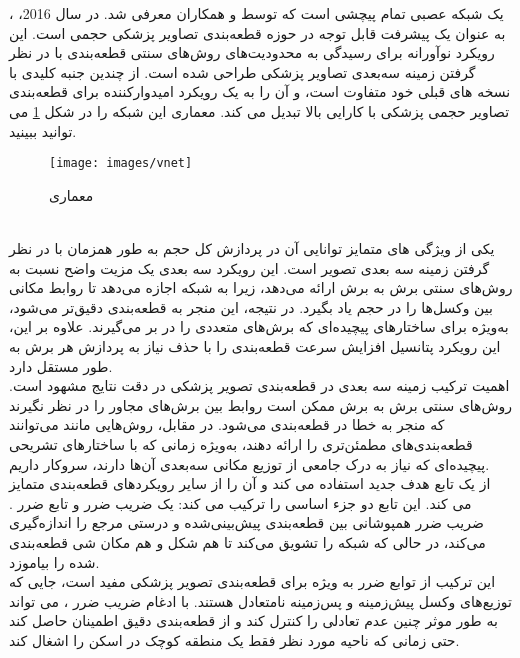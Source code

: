 ، یک شبکه عصبی تمام پیچشی است که توسط و همکاران\cite{shamshad2023transformers} معرفی شد. در سال 2016، به عنوان یک پیشرفت قابل توجه در حوزه قطعه‌بندی تصاویر پزشکی حجمی است. این رویکرد نوآورانه برای رسیدگی به محدودیت‌های روش‌های سنتی قطعه‌بندی با در نظر گرفتن زمینه سه‌بعدی تصاویر پزشکی طراحی شده است.  از چندین جنبه کلیدی با نسخه های قبلی خود متفاوت است، و آن را به یک رویکرد امیدوارکننده برای قطعه‌بندی تصاویر حجمی پزشکی با کارایی بالا تبدیل می کند. معماری این شبکه را در شکل \ref{fig:vnet} می توانید ببینید.
\\
\begin{figure}[ht]
\centerline{\texttt{[image: images/vnet]}}
\caption[\hspace{0.5em}معماری ]{معماری \cite{shamshad2023transformers}}
\label{fig:vnet}
\end{figure}
\\
یکی از ویژگی های متمایز  توانایی آن در پردازش کل حجم به طور همزمان با در نظر گرفتن زمینه سه بعدی تصویر است. این رویکرد سه بعدی یک مزیت واضح نسبت به روش‌های سنتی برش به برش ارائه می‌دهد، زیرا به شبکه اجازه می‌دهد تا روابط مکانی بین وکسل‌ها را در حجم یاد بگیرد. در نتیجه، این منجر به قطعه‌بندی دقیق‌تر می‌شود، به‌ویژه برای ساختارهای پیچیده‌ای که برش‌های متعددی را در بر می‌گیرند. علاوه بر این، این رویکرد پتانسیل افزایش سرعت قطعه‌بندی را با حذف نیاز به پردازش هر برش به طور مستقل دارد.
\\
اهمیت ترکیب زمینه سه بعدی در قطعه‌بندی تصویر پزشکی در دقت نتایج مشهود است. روش‌های سنتی برش به برش ممکن است روابط بین برش‌های مجاور را در نظر نگیرند که منجر به خطا در قطعه‌بندی می‌شود. در مقابل، روش‌هایی مانند  می‌توانند قطعه‌بندی‌های مطمئن‌تری را ارائه دهند، به‌ویژه زمانی که با ساختارهای تشریحی پیچیده‌ای که نیاز به درک جامعی از توزیع مکانی سه‌بعدی آن‌ها دارند، سروکار داریم.
\\
 از یک تابع هدف جدید استفاده می کند و آن را از سایر رویکردهای قطعه‌بندی متمایز می کند. این تابع دو جزء اساسی را ترکیب می کند: یک ضریب ضرر  و تابع ضرر . ضریب ضرر  همپوشانی بین قطعه‌بندی پیش‌بینی‌شده و درستی مرجع را اندازه‌گیری می‌کند، در حالی که  شبکه را تشویق می‌کند تا هم شکل و هم مکان شی قطعه‌بندی شده را بیاموزد.
\\
این ترکیب از توابع ضرر به ویژه برای قطعه‌بندی تصویر پزشکی مفید است، جایی که توزیع‌های وکسل پیش‌زمینه و پس‌زمینه نامتعادل هستند.  با ادغام ضریب ضرر ، می تواند به طور موثر چنین عدم تعادلی را کنترل کند و از قطعه‌بندی دقیق اطمینان حاصل کند حتی زمانی که ناحیه مورد نظر فقط یک منطقه کوچک در اسکن را اشغال کند.
